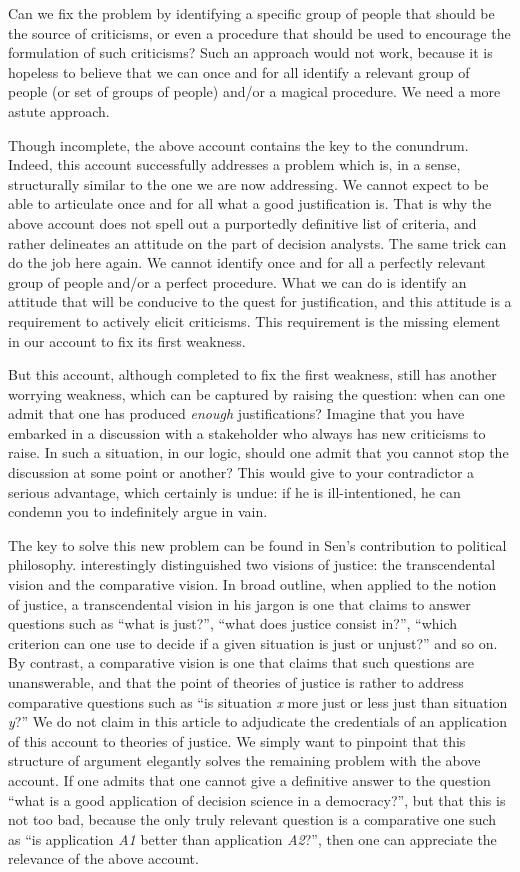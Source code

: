 \documentclass[preprint, french, english, 11pt, authoryear]{elsarticle}%
\begin{document}
Can we fix the problem by identifying a specific group of people that should be the source of criticisms, or even a procedure that should be used to encourage the formulation of such criticisms? Such an approach would not work, because it is hopeless to believe that we can once and for all identify a relevant group of people (or set of groups of people) and/or a magical procedure. We need a more astute approach.

Though incomplete, the above account contains the key to the conundrum. Indeed, this account successfully addresses a problem which is, in a sense, structurally similar to the one we are now addressing. We cannot expect to be able to articulate once and for all what a good justification is. That is why the above account does not spell out a purportedly definitive list of criteria, and rather delineates an attitude on the part of decision analysts. The same trick can do the job here again. We cannot identify once and for all a perfectly relevant group of people and/or a perfect procedure. What we can do is identify an attitude that will be conducive to the quest for justification, and this attitude is a requirement to actively elicit criticisms. This requirement is the missing element in our account to fix its first weakness.

But this account, although completed to fix the first weakness, still has another worrying weakness, which can be captured by raising the question: when can one admit that one has produced \emph{enough} justifications? Imagine that you have embarked in a discussion with a stakeholder who always has new criticisms to raise. In such a situation, in our logic, should one admit that you cannot stop the discussion at some point or another? This would give to your contradictor a serious advantage, which certainly is undue: if he is ill-intentioned, he can condemn you to indefinitely argue in vain.

The key to solve this new problem can be found in Sen's contribution to political philosophy. \cite{sen_idea_2009} interestingly distinguished two visions of justice: the transcendental vision and the comparative vision. In broad outline, when applied to the notion of justice, a transcendental vision in his jargon is one that claims to answer questions such as ``what is just?'', ``what does justice consist in?'', ``which criterion can one use to decide if a given situation is just or unjust?'' and so on. By contrast, a comparative vision is one that claims that such questions are unanswerable, and that the point of theories of justice is rather to address comparative questions such as ``is situation \emph{x} more just or less just than situation \emph{y}?'' We do not claim in this article to adjudicate the credentials of an application of this account to theories of justice. We simply want to pinpoint that this structure of argument elegantly solves the remaining problem with the above account. If one admits that one cannot give a definitive answer to the question ``what is a good application of decision science in a democracy?'', but that this is not too bad, because the only truly relevant question is a comparative one such as ``is application \emph{A1} better than application \emph{A2}?'', then one can appreciate the relevance of the above account.
\end{document}
